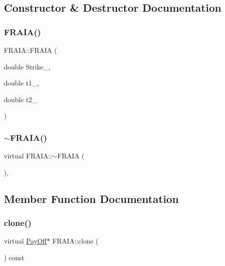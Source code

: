 \subsection{Constructor \& Destructor Documentation}
\hypertarget{classFRAIA_a92f6b039cd46b89c069a50081cb463d9}{}\label{classFRAIA_a92f6b039cd46b89c069a50081cb463d9} 
\subsubsection{\texorpdfstring{F\+R\+A\+I\+A()}{FRAIA()}}
{\footnotesize\ttfamily F\+R\+A\+I\+A\+::\+F\+R\+A\+IA (\begin{DoxyParamCaption}\item[{double}]{Strike\+\_\+,  }\item[{double}]{t1\+\_\+,  }\item[{double}]{t2\+\_\+ }\end{DoxyParamCaption})}

\hypertarget{classFRAIA_ad9c278d2c3d92254f2c0341a3895fbe4}{}\label{classFRAIA_ad9c278d2c3d92254f2c0341a3895fbe4} 
\subsubsection{\texorpdfstring{$\sim$\+F\+R\+A\+I\+A()}{~FRAIA()}}
{\footnotesize\ttfamily virtual F\+R\+A\+I\+A\+::$\sim$\+F\+R\+A\+IA (\begin{DoxyParamCaption}{ }\end{DoxyParamCaption})\hspace{0.3cm}{\ttfamily [inline]}, {\ttfamily [virtual]}}



\subsection{Member Function Documentation}
\hypertarget{classFRAIA_aa11775b4c17e62bed9c6f4114b2a49a7}{}\label{classFRAIA_aa11775b4c17e62bed9c6f4114b2a49a7} 
\subsubsection{\texorpdfstring{clone()}{clone()}}
{\footnotesize\ttfamily virtual \hyperlink{classPayOff}{Pay\+Off}$\ast$ F\+R\+A\+I\+A\+::clone (\begin{DoxyParamCaption}{ }\end{DoxyParamCaption}) const\hspace{0.3cm}{\ttfamily [virtual]}}



